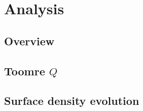 \chapter{Analysis}\label{sec:analysis}

\section{Overview}


\section{Toomre $Q$}


\clearpage
\section{Surface density evolution}\label{sec:anal_sdevo}


